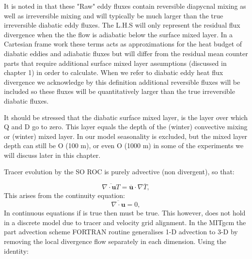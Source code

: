 It is noted in \citet{Plumb2005} that these "Raw" eddy fluxes contain reversible diapycnal mixing as well as irreversible mixing and will typically be much larger than the true irreversible diabatic eddy fluxes. The L.H.S will only represent the residual flux divergence when the the flow is adiabatic below the surface mixed layer. In a Cartesian frame work these terms acts as approximations for the heat budget of diabatic eddies and adiabatic fluxes but will differ from the residual mean counter parts that require additional surface mixed layer assumptions (discussed in chapter 1) in order to calculate. When we refer to diabatic eddy heat flux divergence we acknowledge by this definition additional reversible fluxes will be included so these fluxes will be quantitatively larger than the true irreversible diabatic fluxes.

It should be stressed that the diabatic surface mixed layer, is the layer over which Q and D go to zero. This layer equals the depth of the (winter) convective mixing or (winter) mixed layer. In our model seasonality is excluded, but the mixed layer depth can still be O (100 m), or even O (1000 m) in some of the experiments we will discuss later in this chapter.

Tracer evolution by the SO ROC is purely advective (non divergent), so that:

\begin{equation}
\overline{\nabla \cdot \textbf{u}T} = \overline{\textbf{u}} \cdot  \nabla \overline{T} ,
\label{eq:adv}
\end{equation}
This arises from the continuity equation:
\begin{equation}
\overline{\nabla \cdot \textbf{u}} = 0 ,
\label{eq:cont}
\end{equation}
In continuous equations if  is true then  must be true. This however, does not hold in a discrete model due to tracer and velocity grid alignment. In the MITgcm the part advection scheme FORTRAN routine generalises 1-D advection to 3-D by removing the local divergence flow separately in each dimension. Using the identity:

